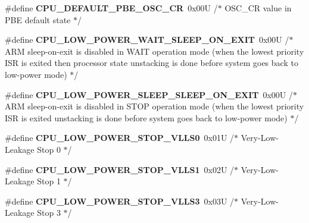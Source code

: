 \begin{DoxyCompactItemize}
\item 
\#define {\bfseries C\+P\+U\+\_\+\+D\+E\+F\+A\+U\+L\+T\+\_\+\+P\+B\+E\+\_\+\+O\+S\+C\+\_\+\+CR}~0x00\+U     /$\ast$ O\+S\+C\+\_\+\+C\+R value in P\+B\+E default state $\ast$/\hypertarget{group___c_p_u___config__module_ga7755fc574a68d218a2486004733d5573}{}\label{group___c_p_u___config__module_ga7755fc574a68d218a2486004733d5573}

\item 
\#define {\bfseries C\+P\+U\+\_\+\+L\+O\+W\+\_\+\+P\+O\+W\+E\+R\+\_\+\+W\+A\+I\+T\+\_\+\+S\+L\+E\+E\+P\+\_\+\+O\+N\+\_\+\+E\+X\+IT}~0x00\+U     /$\ast$ A\+R\+M sleep-\/on-\/exit is disabled in W\+A\+I\+T operation mode (when the lowest priority I\+S\+R is exited then processor state unstacking is done before system goes back to low-\/power mode) $\ast$/\hypertarget{group___c_p_u___config__module_ga88018645e4d9a3b5b7c6250ea1c04cb3}{}\label{group___c_p_u___config__module_ga88018645e4d9a3b5b7c6250ea1c04cb3}

\item 
\#define {\bfseries C\+P\+U\+\_\+\+L\+O\+W\+\_\+\+P\+O\+W\+E\+R\+\_\+\+S\+L\+E\+E\+P\+\_\+\+S\+L\+E\+E\+P\+\_\+\+O\+N\+\_\+\+E\+X\+IT}~0x00\+U     /$\ast$ A\+R\+M sleep-\/on-\/exit is disabled in S\+T\+O\+P operation mode (when the lowest priority I\+S\+R is exited unstacking is done before system goes back to low-\/power mode) $\ast$/\hypertarget{group___c_p_u___config__module_gaff3b98438606a9fc891f7f3c997c9f0c}{}\label{group___c_p_u___config__module_gaff3b98438606a9fc891f7f3c997c9f0c}

\item 
\#define {\bfseries C\+P\+U\+\_\+\+L\+O\+W\+\_\+\+P\+O\+W\+E\+R\+\_\+\+S\+T\+O\+P\+\_\+\+V\+L\+L\+S0}~0x01\+U     /$\ast$ Very-\/\+Low-\/\+Leakage Stop 0 $\ast$/\hypertarget{group___c_p_u___config__module_ga0986c2a288974bf66875fd64f50d09cd}{}\label{group___c_p_u___config__module_ga0986c2a288974bf66875fd64f50d09cd}

\item 
\#define {\bfseries C\+P\+U\+\_\+\+L\+O\+W\+\_\+\+P\+O\+W\+E\+R\+\_\+\+S\+T\+O\+P\+\_\+\+V\+L\+L\+S1}~0x02\+U     /$\ast$ Very-\/\+Low-\/\+Leakage Stop 1 $\ast$/\hypertarget{group___c_p_u___config__module_ga4d263214bdc1c558379e508dafe40409}{}\label{group___c_p_u___config__module_ga4d263214bdc1c558379e508dafe40409}

\item 
\#define {\bfseries C\+P\+U\+\_\+\+L\+O\+W\+\_\+\+P\+O\+W\+E\+R\+\_\+\+S\+T\+O\+P\+\_\+\+V\+L\+L\+S3}~0x03\+U     /$\ast$ Very-\/\+Low-\/\+Leakage Stop 3 $\ast$/\hypertarget{group___c_p_u___config__module_gaef63c101290b27c091db84ad920a6512}{}\label{group___c_p_u___config__module_gaef63c101290b27c091db84ad920a6512}


\end{DoxyCompactItemize}
